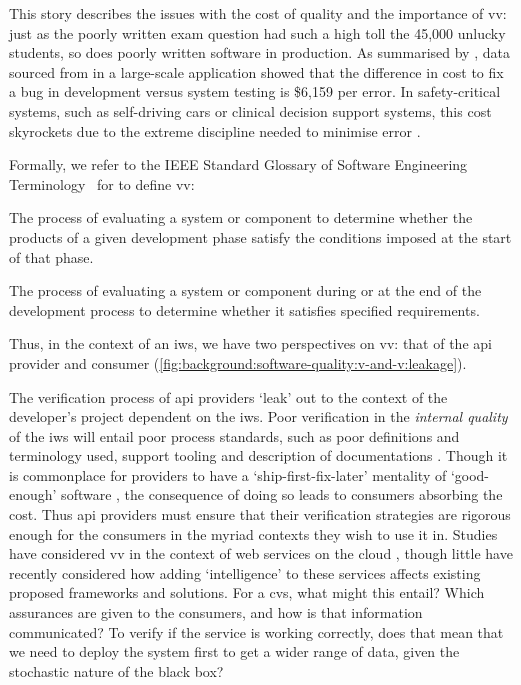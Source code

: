 This story describes the issues with the cost of quality \citep{Boehm:2005vj} and the importance of \gls{vv}: just as the poorly written exam question had such a high toll the 45,000 unlucky students, so does poorly written software in production. As summarised by \citet{Pressman:2005vf}, data sourced from \citet{Cigital:2003tl} in a large-scale application showed that the difference in cost to fix a bug in development versus system testing is \$6,159 per error. In safety-critical systems, such as self-driving cars or clinical decision support systems, this cost skyrockets due to the extreme discipline needed to minimise error \citep{Tassey:2002vu}.

Formally, we refer to the IEEE Standard Glossary of Software Engineering Terminology~\citep{IEEE:1990wp} for to define \gls{vv}:

\begin{samepage}
\begin{description}[font=\itshape,style=multiline,leftmargin=3cm]
  \item[verification] The process of evaluating a system or component to determine whether the products of a given development phase satisfy the conditions imposed at the start of that phase.
  \item[validation] The process of evaluating a system or component during or at the end of the development process to determine whether it satisfies specified requirements. 
\end{description} 
\end{samepage}

\noindent
Thus, in the context of an \gls{iws}, we have two perspectives on \gls{vv}: that of the \gls{api} provider and consumer (\cref{fig:background:software-quality:v-and-v:leakage}).

The verification process of \gls{api} providers `leak' out to the context of the developer's project dependent on the \gls{iws}. Poor verification in the \textit{internal quality} of the \gls{iws} will entail poor process standards, such as poor definitions and terminology used, support tooling and description of documentations \citep{Sommerville:2011uc}. Though it is commonplace for providers to have a `ship-first-fix-later' mentality of `good-enough' software \citep{Venners:2003vw}, the consequence of doing so leads to consumers absorbing the cost. Thus \gls{api} providers must ensure that their verification strategies are rigorous enough for the consumers in the myriad contexts they wish to use it in. Studies have considered \gls{vv} in the context of web services on the cloud \citep{Nakajima:2002ut,Narayanan:2002ti,Foster:2003ur,Heckel:2005uk,Canfora:2006vk,Canfora:2005vd,Yi:2004ve,Bai:2007tl}, though little have recently considered how adding `intelligence' to these services affects existing proposed frameworks and solutions. For a \gls{cvs}, what might this entail? Which assurances are given to the consumers, and how is that information communicated? To verify if the service is working correctly, does that mean that we need to deploy the system first to get a wider range of data, given the stochastic nature of the black box?

